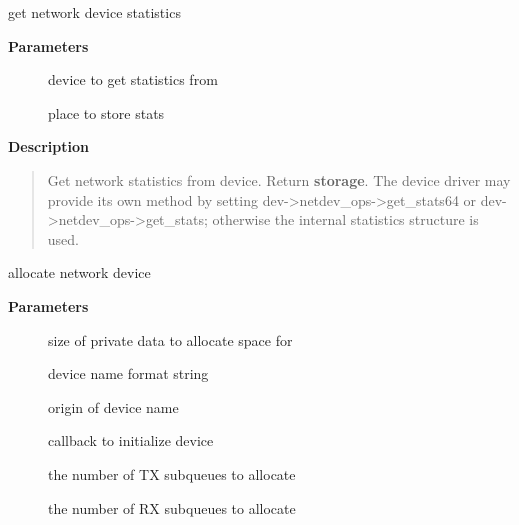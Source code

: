 \documentclass[a4paper,8pt,english]{sphinxmanual}
\begin{document}
\begin{fulllineitems}
\label{networking/kapi:c.dev_get_stats}
get network device statistics

\end{fulllineitems}


\textbf{Parameters}
\begin{description}
\item[{}] \leavevmode
device to get statistics from

\item[{}] \leavevmode
place to store stats

\end{description}

\textbf{Description}
\begin{quote}

Get network statistics from device. Return \textbf{storage}.
The device driver may provide its own method by setting
dev-\textgreater{}netdev\_ops-\textgreater{}get\_stats64 or dev-\textgreater{}netdev\_ops-\textgreater{}get\_stats;
otherwise the internal statistics structure is used.
\end{quote}

\begin{fulllineitems}
\label{networking/kapi:c.alloc_netdev_mqs}
allocate network device

\end{fulllineitems}


\textbf{Parameters}
\begin{description}
\item[{}] \leavevmode
size of private data to allocate space for

\item[{}] \leavevmode
device name format string

\item[{}] \leavevmode
origin of device name

\item[{}] \leavevmode
callback to initialize device

\item[{}] \leavevmode
the number of TX subqueues to allocate

\item[{}] \leavevmode
the number of RX subqueues to allocate

\end{description}
\end{document}
